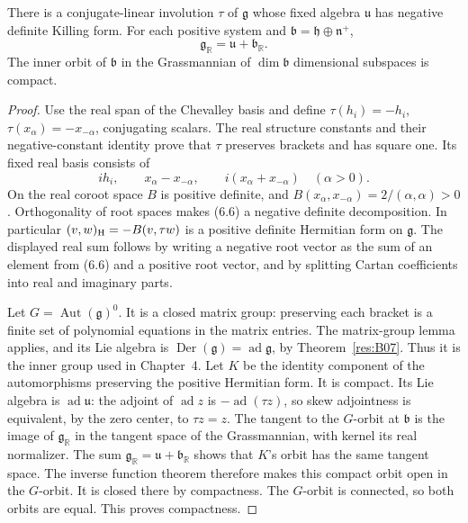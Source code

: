 \begin{lemma}
\label{supp:compact-form-flag}
There is a conjugate-linear involution \(\tau\) of
\(\mathfrak g\) whose fixed algebra \(\mathfrak u\)
has negative definite Killing form. For each positive system
and \(\mathfrak b=\mathfrak h\oplus\mathfrak n^+\),
\[
 \mathfrak g_{\mathbb R}=\mathfrak u+\mathfrak b_{\mathbb R}.
\]
The inner orbit of \(\mathfrak b\) in the Grassmannian of
\(\dim\mathfrak b\) dimensional subspaces is compact.
\end{lemma}
\begin{proof}
Use the real span of the Chevalley basis and define
\(\tau(h_i)=-h_i\), \(\tau(x_\alpha)=-x_{-\alpha}\),
conjugating scalars. The real structure constants and their
negative-constant identity prove that \(\tau\) preserves
brackets and has square one.
Its fixed real basis consists of
\[
 ih_i,\qquad x_\alpha-x_{-\alpha},\qquad
 i(x_\alpha+x_{-\alpha})\quad(\alpha>0).
 \tag{6.6}
\]
On the real coroot space \(B\) is positive definite,
and \(B(x_\alpha,x_{-\alpha})=2/(\alpha,\alpha)>0\).
Orthogonality of root spaces makes (6.6) a negative
definite decomposition. In particular
\((v,w)_{\rm H}=-B(v,\tau w)\) is a positive definite
Hermitian form on \(\mathfrak g\).
The displayed real sum follows by writing a negative root
vector as the sum of an element from (6.6) and a positive
root vector, and by splitting Cartan coefficients into
real and imaginary parts.

Let \(G=\operatorname{Aut}(\mathfrak g)^0\).
It is a closed matrix group: preserving each bracket is
a finite set of polynomial equations in the matrix entries.
The matrix-group lemma applies, and its Lie algebra is
\(\operatorname{Der}(\mathfrak g)=\operatorname{ad}\mathfrak g\),
by Theorem~\ref{res:B07}. Thus it is the inner group used
in Chapter~4.
Let \(K\) be the identity component of the automorphisms
preserving the positive Hermitian form. It is compact.
Its Lie algebra is \(\operatorname{ad}\mathfrak u\):
the adjoint of \(\operatorname{ad}z\) is
\(-\operatorname{ad}(\tau z)\), so skew adjointness is
equivalent, by the zero center, to \(\tau z=z\).
The tangent to the \(G\)-orbit at \(\mathfrak b\) is the
image of \(\mathfrak g_{\mathbb R}\) in the tangent
space of the Grassmannian, with kernel its real normalizer.
The sum \(\mathfrak g_{\mathbb R}=\mathfrak u+
\mathfrak b_{\mathbb R}\) shows that \(K\)'s orbit has
the same tangent space. The inverse function theorem
therefore makes this compact orbit open in the \(G\)-orbit.
It is closed there by compactness. The \(G\)-orbit is
connected, so both orbits are equal. This proves compactness.
\end{proof}

